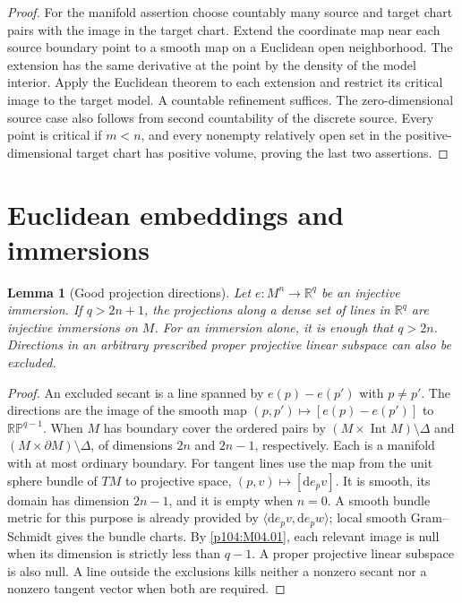 \documentclass[11pt,oneside,openany]{book}
\newtheorem{lemma}[theorem]{Lemma}
\theoremstyle{definition}
\theoremstyle{remark}
\newcommand{\R}{\mathbb R}
\newcommand{\dd}{\mathrm d}
\begin{document}
\begin{proof}
For the manifold assertion choose countably many source and target chart pairs with the image in the target chart. Extend the coordinate map near each source boundary point to a smooth map on a Euclidean open neighborhood. The extension has the same derivative at the point by the density of the model interior. Apply the Euclidean theorem to each extension and restrict its critical image to the target model. A countable refinement suffices. The zero-dimensional source case also follows from second countability of the discrete source. Every point is critical if \(m<n\), and every nonempty relatively open set in the positive-dimensional target chart has positive volume, proving the last two assertions.
\end{proof}

\section{Euclidean embeddings and immersions}

\begin{lemma}[Good projection directions]\label{p104:good-directions}
Let \(e:M^n\to\R^q\) be an injective immersion. If \(q>2n+1\), the projections along a dense set of lines in \(\R^q\) are injective immersions on \(M\). For an immersion alone, it is enough that \(q>2n\). Directions in an arbitrary prescribed proper projective linear subspace can also be excluded.
\end{lemma}
\begin{proof}
An excluded secant is a line spanned by \(e(p)-e(p')\) with \(p\ne p'\). The directions are the image of the smooth map \((p,p')\mapsto[e(p)-e(p')]\) to \(\mathbb{RP}^{q-1}\). When \(M\) has boundary cover the ordered pairs by \((M\times\operatorname{Int}M)\setminus\Delta\) and \((M\times\partial M)\setminus\Delta\), of dimensions \(2n\) and \(2n-1\), respectively. Each is a manifold with at most ordinary boundary. For tangent lines use the map from the unit sphere bundle of \(TM\) to projective space, \((p,v)\mapsto[\dd e_pv]\). It is smooth, its domain has dimension \(2n-1\), and it is empty when \(n=0\). A smooth bundle metric for this purpose is already provided by \(\langle\dd e_pv,\dd e_pw\rangle\); local smooth Gram--Schmidt gives the bundle charts. By \cref{p104:M04.01}, each relevant image is null when its dimension is strictly less than \(q-1\). A proper projective linear subspace is also null. A line outside the exclusions kills neither a nonzero secant nor a nonzero tangent vector when both are required.
\end{proof}
\end{document}
